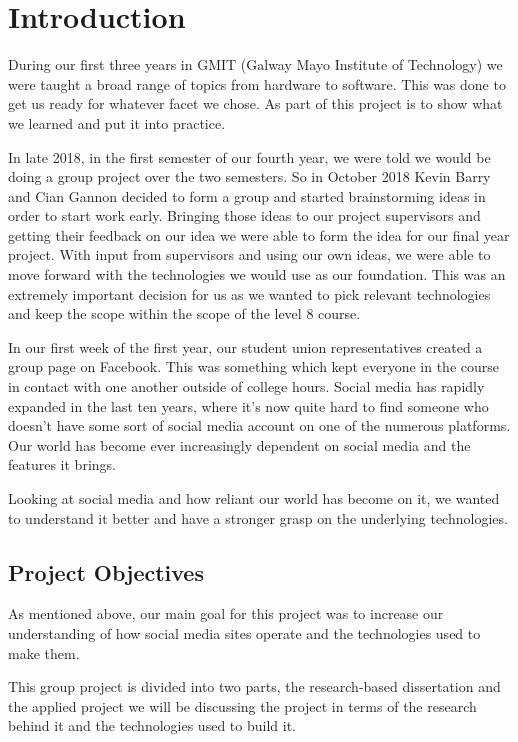 \chapter{Introduction}
During our first three years in GMIT (Galway Mayo Institute of Technology) we were taught a broad range of topics from hardware to software. This was done to get us ready for whatever facet we chose. As part of this project is to show what we learned and put it into practice.

In late 2018, in the first semester of our fourth year, we were told we would be doing a group project over the two semesters. So in October 2018 Kevin Barry and Cian Gannon decided to form a group and started brainstorming ideas in order to start work early. Bringing those ideas to our project supervisors and getting their feedback on our idea we were able to form the idea for our final year project. With input from supervisors and using our own ideas, we were able to move forward with the technologies we would use as our foundation. This was an extremely important decision for us as we wanted to pick relevant technologies and keep the scope within the scope of the level 8 course. 

In our first week of the first year, our student union representatives created a group page on Facebook. This was something which kept everyone in the course in contact with one another outside of college hours. Social media has rapidly expanded in the last ten years, where it's now quite hard to find someone who doesn't have some sort of social media account on one of the numerous platforms. Our world has become ever increasingly dependent on social media and the features it brings.

Looking at social media and how reliant our world has become on it, we wanted to understand it better and have a stronger grasp on the underlying technologies.

\section{Project Objectives} \label{objectives}
As mentioned above, our main goal for this project was to increase our understanding of how social media sites operate and the technologies used to make them.

This group project is divided into two parts, the research-based dissertation and the applied project we will be discussing the project in terms of the research behind it and the technologies used to build it.

